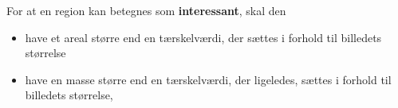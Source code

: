 \documentclass[xcolor=table]{beamer}
\begin{document}
\begin{frame}
{    \begin{definition}
        For at en region kan betegnes som \textbf{\alert{interessant}}, skal den
        \begin{itemize}
            \item have et areal større end en tærskelværdi, der sættes i
                forhold til billedets størrelse
            \item have en masse større end en tærskelværdi, der ligeledes,
                sættes i forhold til billedets størrelse,
        \end{itemize}
    \end{definition}
    }

\end{frame}

\subsection*{}
\end{document}
